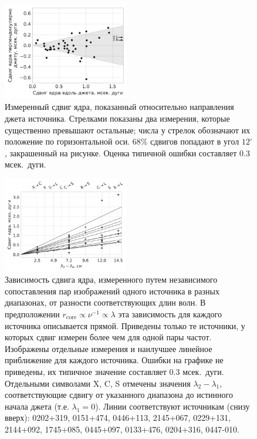 \begin{figure}
 \centering
 \includegraphics[width=0.49\textwidth]{cs_alignment}
 \caption{Измеренный сдвиг ядра, показанный относительно направления джета источника. Стрелками
показаны два измерения, которые существенно превышают остальные; числа у стрелок обозначают их
положение по горизонтальной оси. 68\% сдвигов попадают в угол $12^\circ$, закрашенный на рисунке.
Оценка типичной ошибки составляет 0.3 мсек.~дуги.}
 \label{fig:cs_alignment}
\end{figure}

\begin{figure}
 \centering
 \includegraphics[width=0.49\textwidth]{cs_freqdep}
 \caption{ Зависимость сдвига ядра, измеренного путем независимого сопоставления пар
изображений одного источника в разных диапазонах, от разности соответствующих длин волн. В
предположении $r_\mathrm{core} \propto \nu^{-1} \propto \lambda$ эта зависимость для каждого
источника описывается прямой. Приведены только те источники, у которых сдвиг измерен более чем для
одной пары частот. Изображены отдельные измерения и наилучшее линейное приближение для каждого
источника. Ошибки на графике не приведены, их типичное значение составляет 0.3 мсек.~дуги.
Отдельными символами X, C, S отмечены значения $\lambda_2 - \lambda_1$, соответствующие сдвигу от
указанного диапазона до истинного начала джета (т.е. $\lambda_1 = 0$).  Линии соответствуют
источникам (снизу вверх): 0202+319, 0151+474, 0446+113, 2145+067, 0229+131, 2144+092, 1745+085,
0445+097, 0133+476, 0204+316, 0447-010.
 }
 \label{fig:cs_freqdep}
\end{figure}

